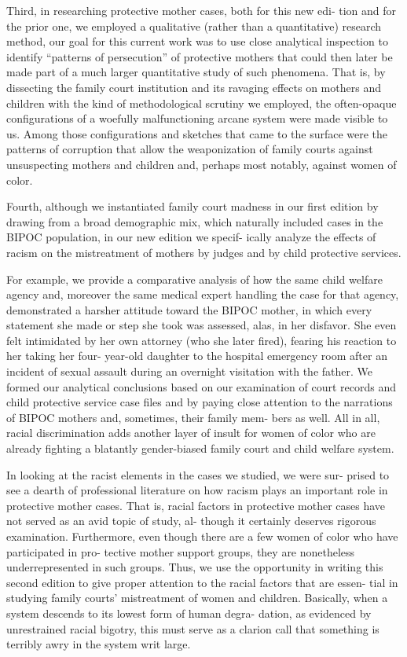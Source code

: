 Third, in researching protective mother cases, both for this new edi-
tion and for the prior one, we employed a qualitative (rather than a
quantitative) research method, our goal for this current work was to
use close analytical inspection to identify “patterns of persecution” of
protective mothers that could then later be made part of a much larger
quantitative study of such phenomena. That is, by dissecting the family
court institution and its ravaging effects on mothers and children with
the kind of methodological scrutiny we employed, the often-opaque
configurations of a woefully malfunctioning arcane system were made
visible to us. Among those configurations and sketches that came to the
surface were the patterns of corruption that allow the weaponization of
family courts against unsuspecting mothers and children and, perhaps
most notably, against women of color. \pfl{}


Fourth, although we instantiated family court madness in our first
edition by drawing from a broad demographic mix, which naturally
included cases in the BIPOC population, in our new edition we specif-
ically analyze the effects of racism on the mistreatment of mothers by
judges and by child protective services. \pfl{}


For example, we provide a comparative analysis of how the same
child welfare agency and, moreover the same medical expert handling
the case for that agency, demonstrated a harsher attitude toward the
BIPOC mother, in which every statement she made or step she took
was assessed, alas, in her disfavor. She even felt intimidated by her own
attorney (who she later fired), fearing his reaction to her taking her four-
year-old daughter to the hospital emergency room after an incident of
sexual assault during an overnight visitation with the father. We formed
our analytical conclusions based on our examination of court records
and child protective service case files and by paying close attention to
the narrations of BIPOC mothers and, sometimes, their family mem-
bers as well. All in all, racial discrimination adds another layer of insult
for women of color who are already fighting a blatantly gender-biased
family court and child welfare system. \pfl{}


In looking at the racist elements in the cases we studied, we were sur-
prised to see a dearth of professional literature on how racism plays
an important role in protective mother cases. That is, racial factors in
protective mother cases have not served as an avid topic of study, al-
though it certainly deserves rigorous examination. Furthermore, even
though there are a few women of color who have participated in pro-
tective mother support groups, they are nonetheless underrepresented
in such groups. Thus, we use the opportunity in writing this second
edition to give proper attention to the racial factors that are essen-
tial in studying family courts’ mistreatment of women and children.
Basically, when a system descends to its lowest form of human degra-
dation, as evidenced by unrestrained racial bigotry, this must serve
as a clarion call that something is terribly awry in the system writ
large. \pfl{}


